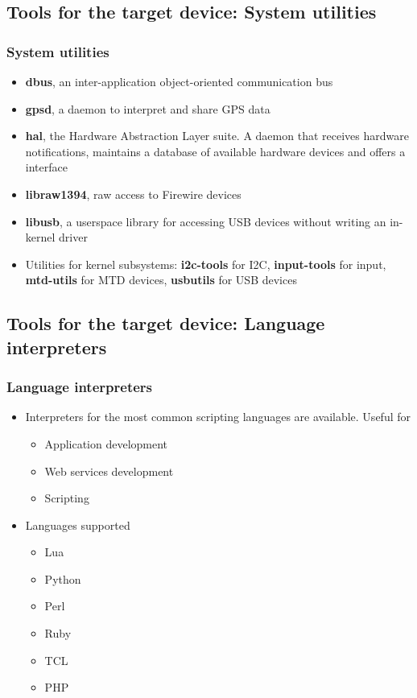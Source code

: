 \subsection[System utilities]{Tools for the target device: System
  utilities}

\begin{frame}
  \frametitle{System utilities}
  \begin{itemize}
  \item {\bf dbus}, an inter-application object-oriented communication bus
  \item {\bf gpsd}, a daemon to interpret and share GPS data
  \item {\bf hal}, the Hardware Abstraction Layer suite. A daemon that
    receives hardware notifications, maintains a database of available
    hardware devices and offers a  interface
  \item {\bf libraw1394}, raw access to Firewire devices
  \item {\bf libusb}, a userspace library for accessing USB devices
    without writing an in-kernel driver
  \item Utilities for kernel subsystems: {\bf i2c-tools} for I2C, {\bf
      input-tools} for input, {\bf mtd-utils} for MTD devices, {\bf
      usbutils} for USB devices
  \end{itemize}
\end{frame}

\subsection[Language Interpreters]{Tools for the target device:
  Language interpreters}

\begin{frame}
  \frametitle{Language interpreters}
  \begin{itemize}
  \item Interpreters for the most common scripting languages are
    available. Useful for
    \begin{itemize}
    \item Application development
    \item Web services development
    \item Scripting
    \end{itemize}
  \item Languages supported
    \begin{itemize}
    \item Lua
    \item Python
    \item Perl
    \item Ruby
    \item TCL
    \item PHP
    \end{itemize}
  \end{itemize}
\end{frame}


